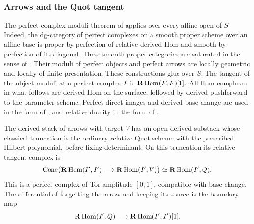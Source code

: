 \subsubsection{Arrows and the Quot tangent}

The perfect-complex moduli theorem of
\cite[Corollaries~3.15, 3.17, and~3.19, Definition~3.18,
Lemma~3.27, and Corollary~3.29]{TV}
applies over every affine open of \(S\).
Indeed, the dg-category of perfect complexes on a smooth proper scheme
over an affine base is proper by perfection of relative derived Hom
and smooth by perfection of its diagonal. These smooth proper categories are saturated in the sense of
\cite[Lemma~3.27 and Corollary~3.29]{TV}. Their moduli of perfect objects
and perfect arrows are locally geometric and locally of finite
presentation. These constructions glue over \(S\).
The tangent of the object moduli at a perfect complex \(F\) is
\(\mathbf R\operatorname{Hom}(F,F)[1]\).
All Hom complexes in what follows are derived Hom on the surface,
followed by derived pushforward to the parameter scheme. Perfect direct
images and derived base change are used in the form of
\cite[Tag~0B91]{Stacks}, and relative duality in the form of
\cite[Tags~0BRT, 0A9Q, and~0B6I]{Stacks}.

\begin{lemma}
\label{lem:quot-arrow}
The derived stack of arrows with target \(V\) has an open derived
substack whose classical truncation is the ordinary relative Quot scheme
with the prescribed Hilbert polynomial, before fixing determinant.
On this truncation its relative tangent complex is
\[
 \operatorname{Cone}\bigl(
 \mathbf R\operatorname{Hom}(I',I')\longrightarrow
 \mathbf R\operatorname{Hom}(I',V)\bigr)
 \simeq \mathbf R\operatorname{Hom}(I',Q).
\]
This is a perfect complex of Tor-amplitude \([0,1]\), compatible with
base change. The differential of forgetting the arrow and keeping its
source is the boundary map
\[
 \mathbf R\operatorname{Hom}(I',Q)\longrightarrow\mathbf R\operatorname{Hom}(I',I')[1].
\]
\end{lemma}

